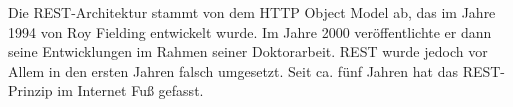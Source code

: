 
Die REST-Architektur stammt von dem HTTP Object Model ab, das im Jahre 1994 von Roy Fielding entwickelt wurde. Im Jahre 2000 veröffentlichte er dann seine Entwicklungen im Rahmen seiner Doktorarbeit. REST wurde jedoch vor Allem in den ersten Jahren falsch umgesetzt. Seit ca. fünf Jahren hat das REST-Prinzip im Internet Fuß gefasst. \cite{WikiREST}